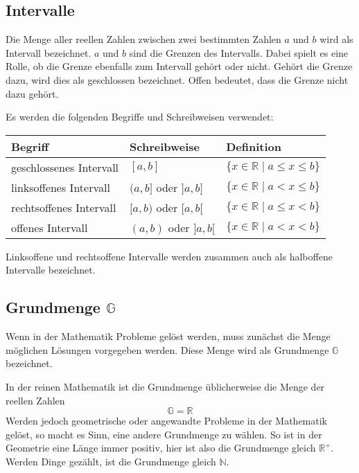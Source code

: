 \subsection{Intervalle}

Die Menge aller reellen Zahlen zwischen zwei bestimmten Zahlen $a$ und $b$ wird als Intervall bezeichnet. $a$ und $b$ sind die Grenzen des Intervalls. Dabei spielt es eine Rolle, ob die Grenze ebenfalls zum Intervall gehört oder nicht. Gehört die Grenze dazu, wird dies als geschlossen bezeichnet. Offen bedeutet, dass die Grenze nicht dazu gehört.

Es werden die folgenden Begriffe und Schreibweisen verwendet:

\begin{center}
  \renewcommand{\arraystretch}{1.1}
  \begin{tabularx}{0.9\textwidth}{XXX}
    \textbf{Begriff} & \textbf{Schreibweise} & \textbf{Definition} \\
  \toprule
    geschlossenes Intervall & $[a, b]$ & $\{ x\in\mathbb{R} \;|\; a \leq x \leq b\}$ \\
  \midrule
    linksoffenes Intervall & $(a, b]$ oder $]a, b]$ & $\{ x\in\mathbb{R} \;|\; a< x \leq b\}$ \\
  \midrule
    rechtsoffenes Intervall & $[a, b)$ oder $[a, b[$ & $\{ x\in\mathbb{R} \;|\; a \leq x < b\}$ \\
  \midrule
    offenes Intervall & $(a, b)$ oder $]a, b[$ & $\{ x\in\mathbb{R} \;|\; a< x < b\}$ \\
  \bottomrule
  \end{tabularx}
\end{center}

Linksoffene und rechtsoffene Intervalle werden zusammen auch als halboffene Intervalle bezeichnet.

\subsection{Grundmenge $\mathbb{G}$}

Wenn in der Mathematik Probleme gelöst werden, muss zunächst die Menge möglichen Lösungen vorgegeben werden. Diese Menge wird als Grundmenge $\mathbb{G}$ bezeichnet.

In der reinen Mathematik ist die Grundmenge üblicherweise die Menge der reellen Zahlen
\[
  \mathbb{G} = \mathbb{R}
\]
Werden jedoch geometrische oder angewandte Probleme in der Mathematik gelöst, so macht es Sinn, eine andere Grundmenge zu wählen. So ist in der Geometrie eine Länge immer positiv, hier ist also die Grundmenge gleich $\mathbb{R^{+}}$. Werden Dinge gezählt, ist die Grundmenge gleich $\mathbb{N}$.

